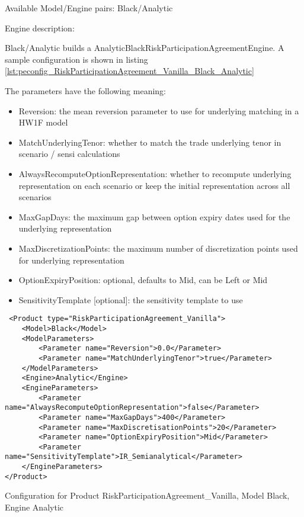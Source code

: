 Available Model/Engine pairs: Black/Analytic

Engine description:

Black/Analytic builds a AnalyticBlackRiskParticipationAgreementEngine. A sample configuration is shown in listing
\ref{lst:peconfig_RiskParticipationAgreement_Vanilla_Black_Analytic}

The parameters have the following meaning:

\begin{itemize}
\item Reversion: the mean reversion parameter to use for underlying matching in a HW1F model
\item MatchUnderlyingTenor: whether to match the trade underlying tenor in scenario / sensi calculations
\item AlwaysRecomputeOptionRepresentation: whether to recompute underlying representation on each scenario or keep the initial representation across all scenarios
\item MaxGapDays: the maximum gap between option expiry dates used for the underlying representation
\item MaxDiscretizationPoints: the maximum number of discretization points used for underlying representation
\item OptionExpiryPosition: optional, defaults to Mid, can be Left or Mid
\item SensitivityTemplate [optional]: the sensitivity template to use 
\end{itemize}

\begin{longlisting}
\begin{verbatim}
 <Product type="RiskParticipationAgreement_Vanilla">
    <Model>Black</Model>
    <ModelParameters>
        <Parameter name="Reversion">0.0</Parameter>
        <Parameter name="MatchUnderlyingTenor">true</Parameter>
    </ModelParameters>
    <Engine>Analytic</Engine>
    <EngineParameters>
        <Parameter name="AlwaysRecomputeOptionRepresentation">false</Parameter>
        <Parameter name="MaxGapDays">400</Parameter>
        <Parameter name="MaxDiscretisationPoints">20</Parameter>
        <Parameter name="OptionExpiryPosition">Mid</Parameter>
        <Parameter name="SensitivityTemplate">IR_Semianalytical</Parameter>
    </EngineParameters>
</Product>
\end{verbatim}
\caption{Configuration for Product RiskParticipationAgreement\_Vanilla, Model Black, Engine Analytic}
\label{lst:peconfig_RiskParticipationAgreement_Vanilla_Black_Analytic}
\end{longlisting}

